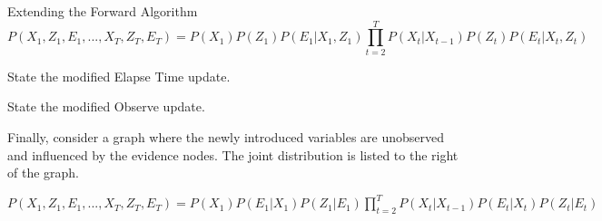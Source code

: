 \begin{problem}{Extending the Forward Algorithm}
$$P(X_1, Z_1, E_1, ..., X_T, Z_T, E_T) = P(X_1) P(Z_1) P(E_1 | X_1, Z_1)  
\prod_{t=2}^T P(X_t | X_{t-1}) P(Z_t) P(E_t | X_t , Z_t)$$


\begin{question}[3]
State the modified Elapse Time update.\\
\end{question}


\begin{question}[3]
State the modified Observe update.\\
\end{question}
\newpage
%
Finally, consider a graph where the newly introduced variables are unobserved and influenced by the evidence nodes. The joint distribution is listed to the right of the graph.\\

\begin{minipage}{4.5cm}
\end{minipage}
\begin{minipage}{15cm}
\begin{center}{
$P(X_1, Z_1, E_1, ..., X_T, Z_T, E_T) = P(X_1) P(E_1 | X_1) P(Z_1 | E_1)  
\prod_{t=2}^T P(X_t | X_{t-1}) P(E_t | X_t) P(Z_t | E_t) $ \\
}
\end{center}
\end{minipage}



\end{problem}
